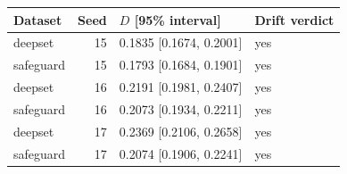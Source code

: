 \begin{tabular}{lrll}
\toprule
Dataset & Seed & $D$ [95\% interval] & Drift verdict\\
\midrule
deepset & 15 & 0.1835 [0.1674, 0.2001] & yes\\
safeguard & 15 & 0.1793 [0.1684, 0.1901] & yes\\
deepset & 16 & 0.2191 [0.1981, 0.2407] & yes\\
safeguard & 16 & 0.2073 [0.1934, 0.2211] & yes\\
deepset & 17 & 0.2369 [0.2106, 0.2658] & yes\\
safeguard & 17 & 0.2074 [0.1906, 0.2241] & yes\\
\bottomrule\end{tabular}
